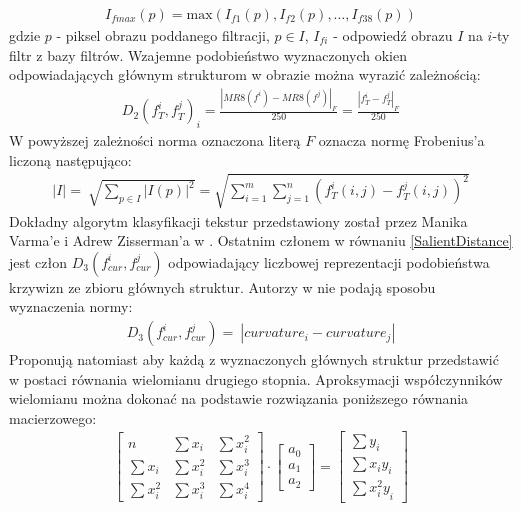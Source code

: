 \documentclass[12pt, twoside, openany]{report}
\theoremstyle{definition}
\begin{document}
\begin{align}
I_{fmax}(p)=\mathrm{max}\mathrm{}(I_{f1}(p),I_{f2}(p),\dots ,I_{f38}(p))
\end{align}
gdzie $p$ - piksel obrazu poddanego filtracji, $p\in I$, $I_{fi}$ - odpowiedź obrazu $I$ na $i$-ty filtr z bazy filtrów. Wzajemne podobieństwo wyznaczonych okien odpowiadających głównym strukturom w obrazie można wyrazić zależnością:
\begin{align}
D_2{\left(f^i_T,f^j_T\right)}_i=\frac{{\left|MR8\left(f^i\right)-MR8\left(f^j\right)\right|}_F}{250}=\frac{{\left|f^i_T-f^j_T\right|}_F}{250}
\end{align}
W powyższej zależności norma oznaczona literą $F$ oznacza normę Frobenius'a liczoną następująco:
\begin{align}
\left|I\right|=\ \sqrt{\sum_{p\in I}{{\left|I\left(p\right)\right|}^2}}=\sqrt{{\sum^m_{i=1}{\sum^n_{j=1}{\left(f^i_T(i,j)-f^j_T(i,j)\right)}}}^2}
\end{align}
Dokładny algorytm klasyfikacji tekstur przedstawiony został przez Manika Varma'e i Adrew Zisserman'a w \cite{varma2009statistical}. Ostatnim członem w równaniu \eqref{SalientDistance} jest człon $D_3\left(f^i_{cur},f^j_{cur}\right)$ odpowiadający liczbowej reprezentacji podobieństwa krzywizn ze zbioru głównych struktur. Autorzy w \cite{SalientStrucTexProp} nie podają sposobu wyznaczenia normy:
\begin{align}
D_3\left(f^i_{cur},f^j_{cur}\right)=\ \left|curvature_i-curvature_j\right|
\end{align}
Proponują natomiast aby każdą z wyznaczonych głównych struktur przedstawić w postaci równania wielomianu drugiego stopnia. Aproksymacji współczynników wielomianu można dokonać na podstawie rozwiązania poniższego równania macierzowego:
\begin{align}
\left[ \begin{array}{ccc}
n & \sum{x_i} & \sum{x^2_i} \\ 
\sum{x_i} & \sum{x^2_i} & \sum{x^3_i} \\ 
\sum{x^2_i} & \sum{x^3_i} & \sum{x^4_i} \end{array}
\right]\cdot \left[ \begin{array}{c}
a_0 \\ 
a_1 \\ 
a_2 \end{array}
\right]=\left[ \begin{array}{c}
\sum{y_i} \\ 
\sum{x_iy_i} \\ 
\sum{{x^2_iy}_i} \end{array}
\right]
\end{align}
\end{document}
